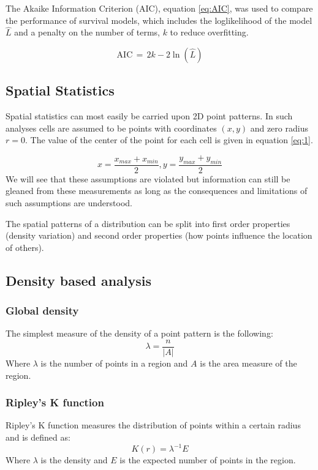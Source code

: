 The Akaike Information Criterion (AIC), equation \ref{eq:AIC}, was used to compare the performance of survival models, which includes the loglikelihood of the model $\hat{L}$ and a penalty on the number of terms, $k$ to reduce overfitting. 

\begin{equation}
\label{eq:AIC}
    {\displaystyle \mathrm {AIC} \,=\,2k-2\ln({\hat {L}})}
\end{equation}

\subsection{Spatial Statistics}

Spatial statistics can most easily be carried upon 2D point patterns. In such analyses cells are assumed to be points with coordinates $(x,y)$ and zero radius $r=0$. The value of the center of the point for each cell is given in equation \ref{eq:1}. 

\begin{equation}    x=\frac{x_{max} + x_{min}}{2}  ,      y = \frac{y_{max} + y_{min}}{2}
\label{eq:1}
\end{equation}
We will see that these assumptions are violated but information can still be gleaned from these measurements as long as the consequences and limitations of such assumptions are understood.

The spatial patterns of a distribution can be split into first order properties (density variation) and second order properties (how points influence the location of others).

\subsection{Density based analysis}

\subsubsection{Global density}
The simplest measure of the density of a point pattern is the following:
\begin{equation}
    \lambda = \frac{n}{|A|}
\end{equation}
Where $\lambda$ is the number of points in a region and $A$ is the area measure of the region. 

\subsubsection{Ripley's K function}
Ripley's K function measures the distribution of points within a certain radius and is defined as:
\begin{equation}
K(r)=\lambda^{-1}E
\end{equation}
Where $\lambda$ is the density and $E$ is the expected number of points in the region.

